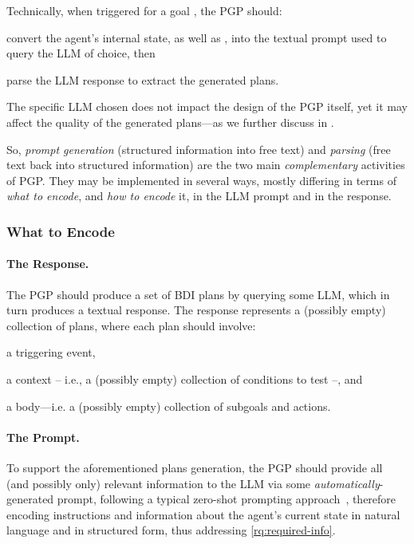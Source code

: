 Technically, when triggered for a goal , the \ac{PGP} should:
%
\begin{inlinelist}
    \item convert the agent's internal state, as well as , into the textual prompt used to query the \ac{LLM} of choice,
    then
    \item parse the \ac{LLM} response to extract the generated plans.
\end{inlinelist}
%
The specific \ac{LLM} chosen does not impact the design of the \ac{PGP} itself,
yet it may affect the quality of the generated plans---as we further discuss in .

So, \emph{prompt generation} (structured information into free text)
and  \emph{parsing} (free text back into structured information)
are the two main \emph{complementary} activities of \ac{PGP}.
%
They may be implemented in several ways,
mostly differing in terms of \emph{what to encode}, and \emph{how to encode} it,
in the \ac{LLM} prompt and in the response.

\subsubsection{What to Encode}\label{sec:pgp-encoding}


\paragraph{The Response.}
%
The \ac{PGP} should produce a set of \ac{BDI} plans by querying some \ac{LLM},
which in turn produces a textual response.
%
The response represents a (possibly empty) collection of plans,
where each plan should involve:
%
\begin{inlinelist}
    \item a triggering event,
    \item a context -- i.e., a (possibly empty) collection of conditions to test --,
    and
    \item a body---i.e. a (possibly empty) collection of subgoals and actions.
\end{inlinelist}

\paragraph{The Prompt.}
%
To support the aforementioned plans generation,
the \ac{PGP} should provide all
(and possibly only)
relevant information to the \ac{LLM}
via some \emph{automatically}-generated prompt,
following a typical zero-shot prompting approach~\cite{KojimaGRMI22},
therefore encoding instructions and information about the
agent's current state in natural language and in structured form,
thus addressing \ref{rq:required-info}.

